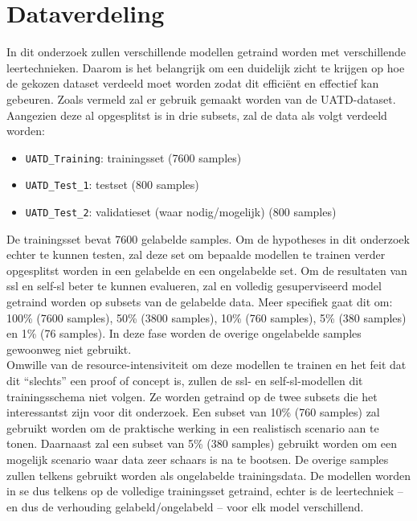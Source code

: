 \section{Dataverdeling}
\label{sec:dataverdeling}

In dit onderzoek zullen verschillende modellen getraind worden met verschillende leertechnieken. Daarom is het belangrijk om een duidelijk zicht te krijgen op hoe de gekozen dataset verdeeld moet worden zodat dit efficiënt en effectief kan gebeuren. Zoals vermeld zal er gebruik gemaakt worden van de UATD-dataset. Aangezien deze al opgesplitst is in drie subsets, zal de data als volgt verdeeld worden:

\begin{itemize}
    \item \texttt{UATD\_Training}: trainingsset (7600 samples)
    \item \texttt{UATD\_Test\_1}: testset (800 samples)
    \item \texttt{UATD\_Test\_2}: validatieset (waar nodig/mogelijk) (800 samples)
\end{itemize}

De trainingsset bevat 7600 gelabelde samples. Om de hypotheses in dit onderzoek echter te kunnen testen, zal deze set om bepaalde modellen te trainen verder opgesplitst worden in een gelabelde en een ongelabelde set. Om de resultaten van \gls{ssl} en \gls{self-sl} beter te kunnen evalueren, zal en volledig gesuperviseerd model getraind worden op subsets van de gelabelde data. Meer specifiek gaat dit om: 100\% (7600 samples), 50\% (3800 samples), 10\% (760 samples), 5\% (380 samples) en 1\% (76 samples). In deze fase worden de overige ongelabelde samples gewoonweg niet gebruikt. \\

Omwille van de resource-intensiviteit om deze modellen te trainen en het feit dat dit ``slechts'' een proof of concept is, zullen de \gls{ssl}- en \gls{self-sl}-modellen dit trainingsschema niet volgen. Ze worden getraind op de twee subsets die het interessantst zijn voor dit onderzoek. Een subset van 10\% (760 samples) zal gebruikt worden om de praktische werking in een realistisch scenario aan te tonen. Daarnaast zal een subset van 5\% (380 samples) gebruikt worden om een mogelijk scenario waar data zeer schaars is na te bootsen. De overige samples zullen telkens gebruikt worden als ongelabelde trainingsdata. De modellen worden in se dus telkens op de volledige trainingsset getraind, echter is de leertechniek -- en dus de verhouding gelabeld/ongelabeld -- voor elk model verschillend.

